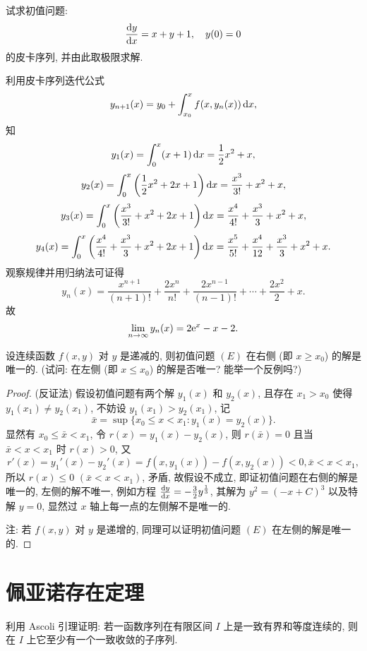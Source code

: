 \begin{exercise}
  试求初值问题:
  \[\frac{\mathop{}\!\mathrm{d} y}{\mathop{}\!\mathrm{d} x}=x+y+1,\quad y(0)=0\]
  的皮卡序列, 并由此取极限求解.
\end{exercise}

\begin{solve}
  利用皮卡序列迭代公式
  \[y_{n+1}(x)=y_0+\int_{x_0}^xf(x,y_n(x))\mathop{}\!\mathrm{d} x,\]
  知
  \[y_1(x)=\int_0^x(x+1)\mathop{}\!\mathrm{d} x=\frac{1}{2}x^2+x,\]
  \[y_2(x)=\int_0^x\left(\frac{1}{2}x^2+2x+1\right)\mathop{}\!\mathrm{d} x=\frac{x^3}{3!}+x^2+x,\]
  \[y_3(x)=\int_0^x\left(\frac{x^3}{3!}+x^2+2x+1\right)\mathop{}\!\mathrm{d} x=\frac{x^4}{4!}+\frac{x^3}{3}+x^2+x,\]
  \[y_4(x)=\int_0^x\left(\frac{x^4}{4!}+\frac{x^3}{3}+x^2+2x+1\right)\mathop{}\!\mathrm{d} x
    =\frac{x^5}{5!}+\frac{x^4}{12}+\frac{x^3}{3}+x^2+x.\]
  观察规律并用归纳法可证得
  \[y_n(x)=\frac{x^{n+1}}{(n+1)!}+\frac{2x^n}{n!}+\frac{2x^{n-1}}{(n-1)!}+\cdots+\frac{2x^2}{2}+x.\]
  故
  \[\lim_{n\to\infty}y_n(x)=2\mathrm{e}^x-x-2.\qedhere\]
\end{solve}



\begin{exercise}
  设连续函数 $f(x,y)$ 对 $y$ 是递减的, 则初值问题 $(E)$ 在右侧
  (即 $x\geq x_0$) 的解是唯一的. (试问: 在左侧 (即 $x\leq x_0$) 的解是否唯一? 能举一个反例吗?)
\end{exercise}

\begin{proof}
  (反证法) 假设初值问题有两个解 $y_1(x)$ 和 $y_2(x)$,
  且存在 $x_1>x_0$ 使得 $y_1(x_1)\neq y_2(x_1)$, 不妨设 $y_1(x_1)>y_2(x_1)$, 记
  \[\bar{x}=\sup\{x_0\leq x<x_1:y_1(x)=y_2(x)\}.\]
  显然有 $x_0\leq\bar{x}<x_1$, 令 $r(x)=y_1(x)-y_2(x)$,
  则 $r(\bar{x})=0$ 且当 $\bar{x}<x<x_1$ 时 $r(x)>0$, 又
  \[r'(x)=y_1'(x)-y_2'(x)=f(x,y_1(x))-f(x,y_2(x))<0,\bar{x}<x<x_1,\]
  所以 $r(x)\leq 0$ $(\bar{x}<x<x_1)$, 矛盾, 故假设不成立,
  即证初值问题在右侧的解是唯一的, 左侧的解不唯一, 
  例如方程 $\frac{\mathop{}\!\mathrm{d} y}{\mathop{}\!\mathrm{d} x}=-\frac{3}{2}y^{\frac{1}{3}}$,
  其解为 $y^2=(-x+C)^3$ 以及特解 $y=0$, 显然过 $x$ 轴上每一点的左侧解不是唯一的.

  注: 若 $f(x,y)$ 对 $y$ 是递增的, 同理可以证明初值问题 $(E)$ 在左侧的解是唯一的.
\end{proof}



\section{佩亚诺存在定理}



\begin{exercise}
  利用 Ascoli 引理证明: 若一函数序列在有限区间 $I$ 上是一致有界和等度连续的, 则在 $I$ 上它至少有一个一致收敛的子序列.
\end{exercise}

